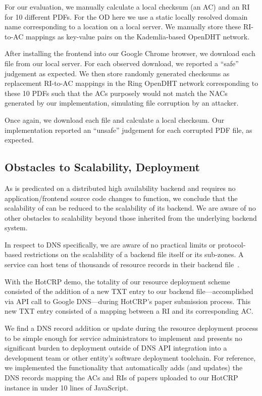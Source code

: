 For our evaluation, we manually calculate a local checksum (\ie an AC) and an RI
for 10 different \CONFERENCE{} PDFs. For the OD here we use a static locally
resolved domain name corresponding to a location on a local server. We manually
store these RI-to-AC mappings as key-value pairs on the Kademlia-based OpenDHT
network.

After installing the frontend into our Google Chrome browser, we download each
file from our local server. For each observed download, we reported a ``safe''
judgement as expected. We then store randomly generated checksums as replacement
RI-to-AC mappings in the Ring OpenDHT network corresponding to these 10 PDFs
such that the ACs purposely would not match the NACs generated by our
implementation, simulating file corruption by an attacker.

Once again, we download each file and calculate a local checksum. Our
implementation reported an ``unsafe'' judgement for each corrupted PDF file, as
expected.

\subsection{Obstacles to Scalability, Deployment}

As \SYSTEM{} is predicated on a distributed high availability backend and
requires no application/frontend source code changes to function, we conclude
that the scalability of \SYSTEM{} can be reduced to the scalability of its
backend. We are aware of no other obstacles to scalability beyond those
inherited from the underlying backend system.

In respect to DNS specifically, we are aware of no practical limits or
protocol-based restrictions on the scalability of a backend file itself or its
sub-zones. A service can host tens of thousands of resource records in their
backend file~\cite{DNS1, DNS2}.

With the HotCRP demo, the totality of our resource deployment scheme consisted
of the addition of a new TXT entry to our backend file---accomplished via API
call to Google DNS---during HotCRP's paper submission process. This new TXT
entry consisted of a mapping between a RI and its corresponding AC.

We find a DNS record addition or update during the resource deployment process
to be simple enough for service administrators to implement and presents no
significant burden to deployment outside of DNS API integration into a
development team or other entity's software deployment toolchain. For reference,
we implemented the functionality that automatically adds (and updates) the DNS
records mapping the ACs and RIs of papers uploaded to our HotCRP instance in
under 10 lines of JavaScript.

